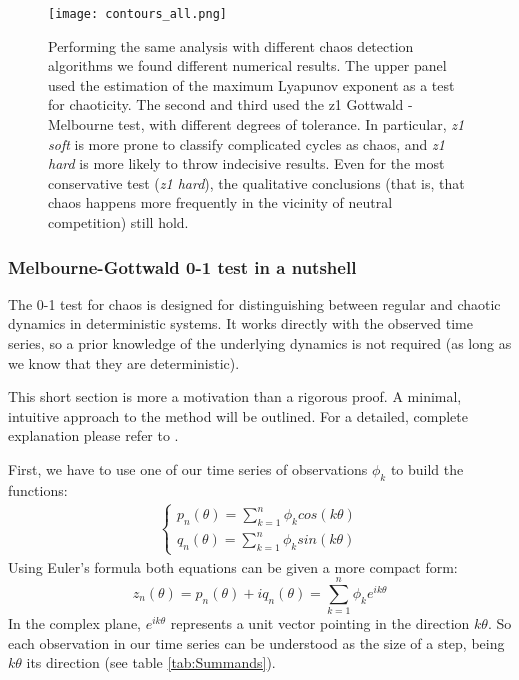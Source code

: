 \begin{figure}[H]
	\begin{center}
		\texttt{[image: contours\_all.png]}
	\end{center}
	\caption{Performing the same analysis with different chaos detection algorithms we found different numerical results. The upper panel used the estimation of the maximum Lyapunov exponent as a test for chaoticity. The second and third used the z1 Gottwald - Melbourne test, with different degrees of tolerance. In particular, \textit{z1 soft} is more prone to classify complicated cycles as chaos, and \textit{z1 hard} is more likely to throw indecisive results. Even for the most conservative test (\textit{z1 hard}), the qualitative conclusions (that is, that chaos happens more frequently in the vicinity of neutral competition) still hold.}
	\label{fig:AllContours}
\end{figure}

\subsubsection{Melbourne-Gottwald 0-1 test in a nutshell}
\label{subsubsec:z1test}
The 0-1 test for chaos is designed for distinguishing between regular and chaotic dynamics in deterministic systems. It works directly with the observed time series, so a prior knowledge of the underlying dynamics is not required (as long as we know that they are deterministic).

This short section is more a motivation than a rigorous proof. A minimal, intuitive approach to the method will be outlined. For a detailed, complete explanation please refer to \citet{Gottwald2009}.

First, we have to use one of our time series of observations $\phi_k$ to build the functions:
%
\begin{eqnarray}
\label{eq:z1}
	\begin{cases}
	p_n(\theta) = \sum_{k=1}^n \phi_k cos(k \theta)
	\\
	q_n(\theta) = \sum_{k=1}^n \phi_k sin(k \theta)
	\end{cases}
\end{eqnarray}
%
Using Euler's formula both equations can be given a more compact form:
%
\begin{equation}
\label{eq:z1complex}
z_n(\theta) = p_n(\theta) + i q_n(\theta) = \sum_{k=1}^n \phi_k e^{i k \theta}
\end{equation}
%
In the complex plane, $e^{i k \theta}$ represents a unit vector pointing in the direction $k \theta$. So each observation in our time series can be understood as the size of a step, being $k \theta$ its direction (see table \ref{tab:Summands}).

